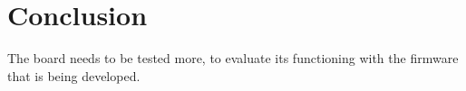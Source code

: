%
%

\section{Conclusion}

The board needs to be tested more, to evaluate its functioning with the firmware that is being developed. 
